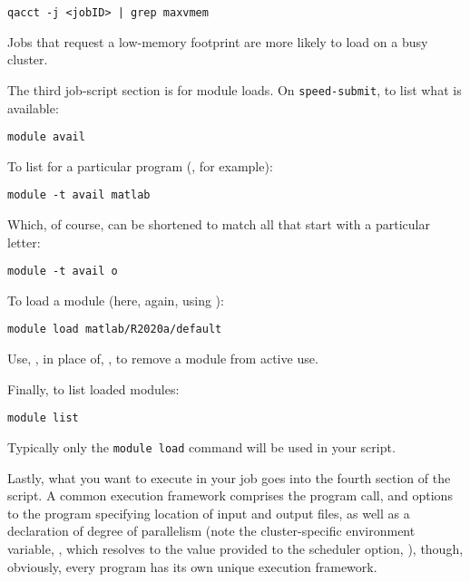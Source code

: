 \documentclass{easychair}
\begin{document}
\begin{verbatim}
qacct -j <jobID> | grep maxvmem
\end{verbatim}

Jobs that request a low-memory footprint are more likely to load on a busy
cluster.

The third job-script section is for module loads. On \texttt{speed-submit}, to list
what is available:

\begin{verbatim}
module avail
\end{verbatim}

To list for a particular program (, for example):

\begin{verbatim}
module -t avail matlab
\end{verbatim}

Which, of course, can be shortened to match all that start with a
particular letter:

\begin{verbatim}
module -t avail o
\end{verbatim}

To load a module (here, again, using ):

\begin{verbatim}
module load matlab/R2020a/default
\end{verbatim}

Use, , in place of, , to remove a module from active use.

Finally, to list loaded modules:

\begin{verbatim}
module list
\end{verbatim}

Typically only the \texttt{module load} command will be used in your script.

Lastly, what you want to execute in your job goes into the fourth section
of the script. A common execution framework comprises the program call,
and options to the program specifying location of input and output files,
as well as a declaration of degree of parallelism (note the
cluster-specific environment variable, , which resolves to the value
provided to the scheduler option, ), though, obviously, every
program has its own unique execution framework.
\end{document}

